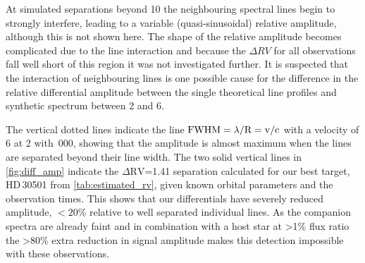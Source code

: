At simulated separations beyond 10\kmps{} the neighbouring spectral lines begin to strongly interfere, leading to a variable (quasi-sinusoidal) relative amplitude, although this is not shown here.
The shape of the relative amplitude becomes complicated due to the line interaction and because the \(\Delta {RV}\) for all observations fall well short of this region it was not investigated further.
It is suspected that the interaction of neighbouring lines is one possible cause for the difference in the relative differential amplitude between the single theoretical line profiles and synthetic spectrum between 2 and 6\kmps{}.

The vertical dotted lines indicate the line \(\rm {\textrm{FWHM}} = \lambda /\textrm{R}=v /c\) with a velocity of 6\kmps{} at 2\um{} with \,000, showing that the amplitude is almost maximum when the lines are separated beyond their line width.
The two solid vertical lines in \cref{fig:diff_amp} indicate the \(\Delta \textrm{RV}\)=1.41\kmps{} separation calculated for our best target, {HD\,30501} from \cref{tab:estimated_rv}, given known orbital parameters and the observation times.
This shows that our differentials have severely reduced amplitude, \(<20\%\) relative to well separated individual lines.
As the companion spectra are already faint and in combination with a host star at >1\% flux ratio the >80\% extra reduction in signal amplitude makes this detection impossible with these observations.

